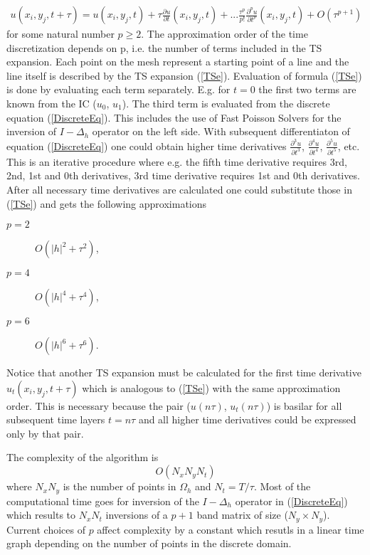 \documentclass[%
 aip,
cp,  %
 amsmath,amssymb,%
 reprint,%
]{revtex4-2}
\newcommand{\rf}[1]{(\ref{#1})}
\begin{document}
\begin{align} \label{TSe}
u(x_i, y_j, t+\tau) = u(x_i, y_j, t) + \tau \frac{ \partial u }{ \partial t }(x_i, y_j, t)  + ... 
\frac{ \tau^p }{ p! } \frac{ \partial^p u }{ \partial t^p }(x_i, y_j, t) + O(\tau^{p+1})
\end{align}
for some natural number $p \ge 2$. The approximation order of the time discretization depends on p, i.e. the number of terms included in the TS expansion. Each point on the mesh represent a starting point of a line and the line itself is described by the TS expansion \rf{TSe}. Evaluation of formula \rf{TSe} is done by evaluating each term separately. E.g. for $t=0$ the first two terms are known from the IC ($u_0$, $u_1$). The third term is evaluated from the discrete equation \rf{DiscreteEq}. This includes the use of Fast Poisson Solvers for the inversion of $I-\Delta_h$ operator on the left side. With subsequent differentiaton of equation \rf{DiscreteEq} one could obtain higher time derivatives $\frac{\partial^3 u}{\partial t^3}$, $\frac{\partial^4 u}{\partial t^4}$, $\frac{\partial^5 u}{\partial t^5}$, etc. This is an iterative procedure where e.g. the fifth time derivative requires 3rd, 2nd, 1st and 0th derivatives, 3rd time derivative requires 1st and 0th derivatives. After all necessary time derivatives are calculated one could substitute those in \rf{TSe} and gets the following approximations
\begin{description}
 \item[$p=2$] $O(|h|^2 + \tau^2)$,
 \item[$p=4$] $O(|h|^4 + \tau^4)$,
 \item[$p=6$] $O(|h|^6 + \tau^6)$.
\end{description}
Notice that another TS expansion must be calculated for the first time derivative $u_t(x_i, y_j, t+\tau)$ which is analogous to \rf{TSe} with the same approximation order. This is necessary because the pair ($u(n\tau)$, $u_t(n\tau)$) is basilar for all subsequent time layers $t=n\tau$ and all higher time derivatives could be expressed only by that pair.

The complexity of the algorithm is
$$ O( N_x N_y N_t ) $$
where $N_x N_y$ is the number of points in $\Omega_h$ and $N_t = T/\tau$. Most of the computational time goes for inversion of the $I-\Delta_h$ operator in \rf{DiscreteEq} which results to $N_x N_t$ inversions of a $p+1$ band matrix of size ($N_y \times N_y$). Current choices of $p$ affect complexity by a constant which resutls in a linear time graph depending on the number of points in the discrete domain.
\end{document}
